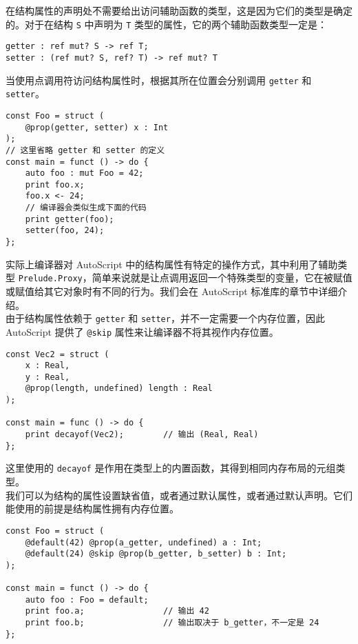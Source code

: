 在结构属性的声明处不需要给出访问辅助函数的类型，这是因为它们的类型是确定的。对于在结构 \lstinline!S! 中声明为 \lstinline!T! 类型的属性，它的两个辅助函数类型一定是：

\begin{lstlisting}
getter : ref mut? S -> ref T;
setter : (ref mut? S, ref? T) -> ref mut? T
\end{lstlisting}

当使用点调用符访问结构属性时，根据其所在位置会分别调用 \lstinline!getter! 和 \lstinline!setter!。

\begin{lstlisting}
const Foo = struct (
	@prop(getter, setter) x : Int
);
// 这里省略 getter 和 setter 的定义
const main = funct () -> do {
	auto foo : mut Foo = 42;
	print foo.x;
	foo.x <- 24;
	// 编译器会类似生成下面的代码
	print getter(foo);
	setter(foo, 24);
};
\end{lstlisting}

实际上编译器对 AutoScript 中的结构属性有特定的操作方式，其中利用了辅助类型 \lstinline!Prelude.Proxy!，简单来说就是让点调用返回一个特殊类型的变量，它在被赋值或赋值给其它对象时有不同的行为。我们会在 AutoScript 标准库的章节中详细介绍。 \\

由于结构属性依赖于 \lstinline!getter! 和 \lstinline!setter!，并不一定需要一个内存位置，因此 AutoScript 提供了 \lstinline!@skip! 属性来让编译器不将其视作内存位置。

\begin{minipage}[c]{0.95\textwidth}
\vspace{1.0em}
\begin{lstlisting}
const Vec2 = struct (
    x : Real,
    y : Real,
    @prop(length, undefined) length : Real
);

const main = func () -> do {
    print decayof(Vec2);		// 输出 (Real, Real)
};
\end{lstlisting}
\end{minipage}

这里使用的 \lstinline!decayof! 是作用在类型上的内置函数，其得到相同内存布局的元组类型。 \\

我们可以为结构的属性设置缺省值，或者通过默认属性，或者通过默认声明。它们能使用的前提是结构属性拥有内存位置。

\begin{lstlisting}
const Foo = struct (
    @default(42) @prop(a_getter, undefined) a : Int;
    @default(24) @skip @prop(b_getter, b_setter) b : Int;
);

const main = funct () -> do {
    auto foo : Foo = default;
    print foo.a;				// 输出 42
    print foo.b;				// 输出取决于 b_getter，不一定是 24
};
\end{lstlisting}


